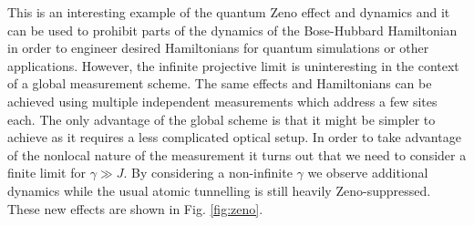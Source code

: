 This is an interesting example of the quantum Zeno effect and dynamics
and it can be used to prohibit parts of the dynamics of the
Bose-Hubbard Hamiltonian in order to engineer desired Hamiltonians for
quantum simulations or other applications. However, the infinite
projective limit is uninteresting in the context of a global
measurement scheme. The same effects and Hamiltonians can be achieved
using multiple independent measurements which address a few sites
each. The only advantage of the global scheme is that it might be
simpler to achieve as it requires a less complicated optical setup. In
order to take advantage of the nonlocal nature of the measurement it
turns out that we need to consider a finite limit for $\gamma \gg
J$. By considering a non-infinite $\gamma$ we observe additional
dynamics while the usual atomic tunnelling is still heavily
Zeno-suppressed. These new effects are shown in Fig. \ref{fig:zeno}.

